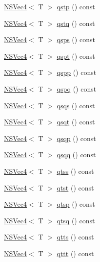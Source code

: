 \begin{DoxyCompactItemize}
\item 
\hyperlink{structNSVec4}{N\-S\-Vec4}$<$ T $>$ \hyperlink{structNSVec4_a7b1a82e869ce13bac92d2c7823091b31}{qstp} () const 
\item 
\hyperlink{structNSVec4}{N\-S\-Vec4}$<$ T $>$ \hyperlink{structNSVec4_a7e114d609a5e5e192c058fcaed9bd475}{qstq} () const 
\item 
\hyperlink{structNSVec4}{N\-S\-Vec4}$<$ T $>$ \hyperlink{structNSVec4_a8619361ea80cf0c07c69e05f3879f74d}{qsps} () const 
\item 
\hyperlink{structNSVec4}{N\-S\-Vec4}$<$ T $>$ \hyperlink{structNSVec4_ad6c7c4110a154a57b4c1f48ba0fad08e}{qspt} () const 
\item 
\hyperlink{structNSVec4}{N\-S\-Vec4}$<$ T $>$ \hyperlink{structNSVec4_afb514efd76a35091ef6cd4a3faf4053a}{qspp} () const 
\item 
\hyperlink{structNSVec4}{N\-S\-Vec4}$<$ T $>$ \hyperlink{structNSVec4_af3826bf1362934fdfdbbc715c3f18d54}{qspq} () const 
\item 
\hyperlink{structNSVec4}{N\-S\-Vec4}$<$ T $>$ \hyperlink{structNSVec4_a7234cd2f33580eac408ead3ed41ad0cc}{qsqs} () const 
\item 
\hyperlink{structNSVec4}{N\-S\-Vec4}$<$ T $>$ \hyperlink{structNSVec4_abea6543c7b3741ebd50048d7101388e8}{qsqt} () const 
\item 
\hyperlink{structNSVec4}{N\-S\-Vec4}$<$ T $>$ \hyperlink{structNSVec4_a4ffb768e7176ddaa1c7cbe2f4946cc11}{qsqp} () const 
\item 
\hyperlink{structNSVec4}{N\-S\-Vec4}$<$ T $>$ \hyperlink{structNSVec4_a453fa4bbfaef562a7de7b39183458216}{qsqq} () const 
\item 
\hyperlink{structNSVec4}{N\-S\-Vec4}$<$ T $>$ \hyperlink{structNSVec4_a21f031731917c4a47b94eaf2d06cc8c8}{qtss} () const 
\item 
\hyperlink{structNSVec4}{N\-S\-Vec4}$<$ T $>$ \hyperlink{structNSVec4_a24fa26e4cc5b183351d6fc450c5906f9}{qtst} () const 
\item 
\hyperlink{structNSVec4}{N\-S\-Vec4}$<$ T $>$ \hyperlink{structNSVec4_a44c6e8ac7abdc1eb6215939eb62b12f7}{qtsp} () const 
\item 
\hyperlink{structNSVec4}{N\-S\-Vec4}$<$ T $>$ \hyperlink{structNSVec4_a5154ae6521f4311c1afb75a142bd6264}{qtsq} () const 
\item 
\hyperlink{structNSVec4}{N\-S\-Vec4}$<$ T $>$ \hyperlink{structNSVec4_a15411138081c8d89c546675422a80908}{qtts} () const 
\item 
\hyperlink{structNSVec4}{N\-S\-Vec4}$<$ T $>$ \hyperlink{structNSVec4_ad0c9256069a4d7c2e5796159b7241988}{qttt} () const 

\end{DoxyCompactItemize}
